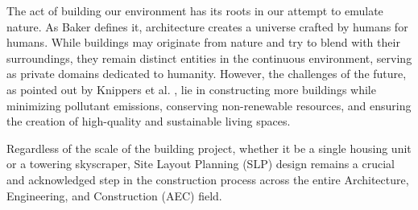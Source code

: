 


The act of building our environment has its roots in our attempt to emulate nature. As Baker \cite{Baker2003} defines it, architecture creates a universe crafted by humans for humans. While buildings may originate from nature and try to blend with their surroundings, they remain distinct entities in the continuous environment, serving as private domains dedicated to humanity. However, the challenges of the future, as pointed out by Knippers et al. \cite{Knippers2021}, lie in constructing more buildings while minimizing pollutant emissions, conserving non-renewable resources, and ensuring the creation of high-quality and sustainable living spaces.

Regardless of the scale of the building project, whether it be a single housing unit or a towering skyscraper, Site Layout Planning (SLP) design remains a crucial and acknowledged step in the construction process across the entire Architecture, Engineering, and Construction (AEC) field. 

        
        


